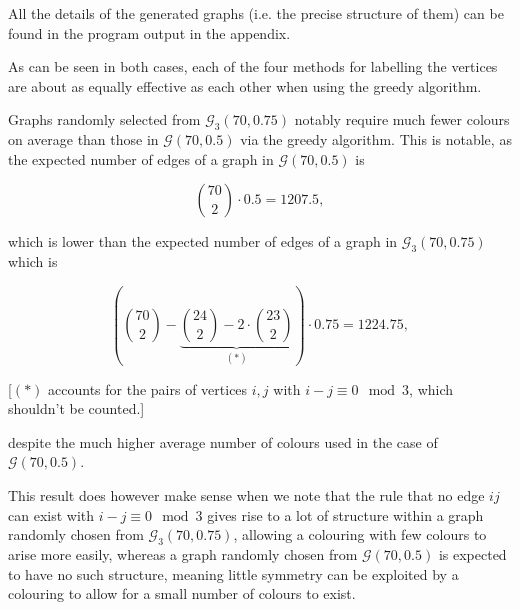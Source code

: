 \documentclass{article}
\begin{document}
\begin{center}
\end{center}

All the details of the generated graphs (i.e. the precise structure of them) can be found in the program output in the appendix.


As can be seen in both cases, each of the four methods for labelling the vertices are about as equally effective as each other when using the greedy algorithm. %

Graphs randomly selected from $\mathcal{G}_3(70,0.75)$ notably require much fewer colours on average than those in $\mathcal{G}(70,0.5)$ via the greedy algorithm. This is notable, as the expected number of edges of a graph in $\mathcal{G}(70,0.5)$ is

$$\binom{70}{2} \cdot 0.5 = 1207.5,$$

which is lower than the expected number of edges of a graph in $\mathcal{G}_3(70,0.75)$ which is

$$\left(\binom{70}{2} - \underbrace{\binom{24}{2} - 2 \cdot \binom{23}{2}}_{(\ast)}\right) \cdot 0.75 = 1224.75,$$

[$(\ast)$ accounts for the pairs of vertices $i,j$ with $i-j \equiv 0 \mod 3$, which shouldn't be counted.]

despite the much higher average number of colours used in the case of $\mathcal{G}(70,0.5)$.

This result does however make sense when we note that the rule that no edge $ij$ can exist with $i-j \equiv 0 \mod 3$ gives rise to a lot of structure within a graph randomly chosen from $\mathcal{G}_3(70,0.75)$, allowing a colouring with few colours to arise more easily, whereas a graph randomly chosen from $\mathcal{G}(70,0.5)$ is expected to have no such structure, meaning little symmetry can be exploited by a colouring to allow for a small number of colours to exist.
\end{document}
